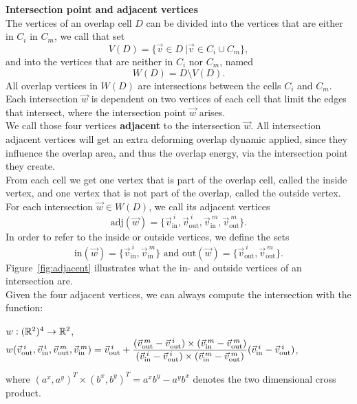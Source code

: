 \begin{definition} \textbf{Intersection point and adjacent vertices} \\
	The vertices of an overlap cell $D$ can be divided into the vertices that are either in $C_i$ in $C_m$, we call that set 
	\[V(D) = \{\vec{v} \in D \:| \vec{v} \in C_i \cup C_m \}, \] 
	and into the vertices that are neither in $C_i$ nor $C_m$, named 
	\[W(D) = D \setminus V(D).\]
	All overlap vertices in $W(D)$ are intersections between the cells $C_i$ and $C_m$. \\
	Each intersection $\vec{w}$ is dependent on two vertices of each cell that limit the edges that intersect, where the intersection point $\vec{w}$ arises. \\
	We call those four vertices \textbf{adjacent} to the intersection $\vec{w}$. 
	All intersection adjacent vertices will get an extra deforming overlap dynamic applied, since they influence the overlap area, and thus the overlap energy, via the intersection point they create. \\
	From each cell we get one vertex that is part of the overlap cell, called the inside vertex, and one vertex that is not part of the overlap, called the outside vertex. 
	For each intersection $\vec{w} \in W(D)$, we call its adjacent vertices 
	\[\text{adj}(\vec{w}) = \{\vec{v}_{\text{in}}^{\: i}, \vec{v}_{\text{out}}^{\: i}, \vec{v}_{\text{in}}^{\: m}, \vec{v}_{\text{out}}^{\: m} \}. \]
	In order to refer to the inside or outside vertices, we define the sets 
	\[ \text{in}(\vec{w}) = \{\vec{v}_{\text{in}}^{\: i}, \vec{v}_{\text{in}}^{\: m} \} \text{ and } \text{out}(\vec{w}) = \{\vec{v}_{\text{out}}^{\: i}, \vec{v}_{\text{out}}^{\: m} \}.\]
	Figure~\ref{fig:adjacent} illustrates what the in- and outside vertices of an intersection are. \\
	Given the four adjacent vertices, we can always compute the intersection with the function:
	\begin{center}
		$w: (\mathbb{R}^2)^4 \rightarrow \mathbb{R}^2$, \\[0.5em]
		$w(\vec{v}_{\text{out}}^{\: i}, \vec{v}_{\text{in}}^{\: i}, \vec{v}_{\text{out}}^{\: m}, \vec{v}_{\text{in}}^{\: m}) = \vec{v}_{\text{out}}^{\: i} + \dfrac{(\vec{v}_{\text{out}}^{\: m} - \vec{v}_{\text{out}}^{\: i}) \times (\vec{v}_{\text{in}}^{\: m} - \vec{v}_{\text{out}}^{\: m})}{(\vec{v}_{\text{in}}^{\: i} - \vec{v}_{\text{out}}^{\: i}) \times (\vec{v}_{\text{in}}^{\: m} - \vec{v}_{\text{out}}^{\: m})} (\vec{v}_{\text{in}}^{\: i} - \vec{v}_{\text{out}}^{\: i})$,
	\end{center}
	where $(a^x, a^y)^T \times (b^x, b^y)^T = a^x b^y - a^y b^x$ denotes the two dimensional cross product. \\
\end{definition}

